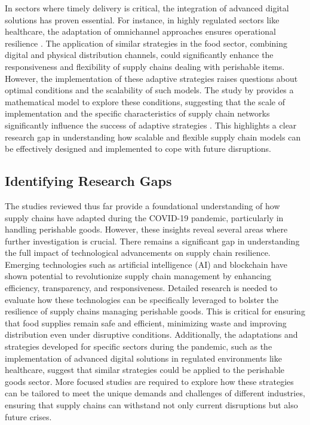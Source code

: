In sectors where timely delivery is critical, the integration of advanced digital solutions has proven essential. For instance, in highly regulated sectors like healthcare, the adaptation of omnichannel approaches ensures operational resilience \parencite{RiveroGutierrez2020OmnichannelSector}. The application of similar strategies in the food sector, combining digital and physical distribution channels, could significantly enhance the responsiveness and flexibility of supply chains dealing with perishable items. However, the implementation of these adaptive strategies raises questions about optimal conditions and the scalability of such models. The study by \textcite{Zhang2020IntegrationBOPS} provides a mathematical model to explore these conditions, suggesting that the scale of implementation and the specific characteristics of supply chain networks significantly influence the success of adaptive strategies \parencite{Zhang2020IntegrationBOPS}. This highlights a clear research gap in understanding how scalable and flexible supply chain models can be effectively designed and implemented to cope with future disruptions.

\subsection{Identifying Research Gaps}

The studies reviewed thus far provide a foundational understanding of how supply chains have adapted during the COVID-19 pandemic, particularly in handling perishable goods. However, these insights reveal several areas where further investigation is crucial. There remains a significant gap in understanding the full impact of technological advancements on supply chain resilience. Emerging technologies such as artificial intelligence (AI) and blockchain have shown potential to revolutionize supply chain management by enhancing efficiency, transparency, and responsiveness. Detailed research is needed to evaluate how these technologies can be specifically leveraged to bolster the resilience of supply chains managing perishable goods. This is critical for ensuring that food supplies remain safe and efficient, minimizing waste and improving distribution even under disruptive conditions. Additionally, the adaptations and strategies developed for specific sectors during the pandemic, such as the implementation of advanced digital solutions in regulated environments like healthcare, suggest that similar strategies could be applied to the perishable goods sector. More focused studies are required to explore how these strategies can be tailored to meet the unique demands and challenges of different industries, ensuring that supply chains can withstand not only current disruptions but also future crises.

